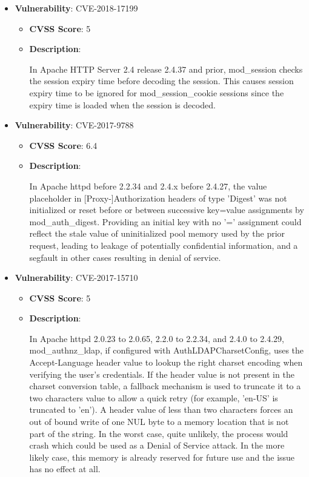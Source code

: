 \documentclass{article}
\begin{document}
\begin{itemize}
        \item \textbf{Vulnerability}: CVE-2018-17199
        \begin{itemize}
            \item \textbf{CVSS Score}:  5 
            \item \textbf{Description}:
            \parbox[t]{0.9\linewidth}{
                \ttfamily In Apache HTTP Server 2.4 release 2.4.37 and prior, mod\_session checks the session expiry time before decoding the session. This causes session expiry time to be ignored for mod\_session\_cookie sessions since the expiry time is loaded when the session is decoded.
            }
        \end{itemize}
    
        \item \textbf{Vulnerability}: CVE-2017-9788
        \begin{itemize}
            \item \textbf{CVSS Score}:  6.4 
            \item \textbf{Description}:
            \parbox[t]{0.9\linewidth}{
                \ttfamily In Apache httpd before 2.2.34 and 2.4.x before 2.4.27, the value placeholder in [Proxy-]Authorization headers of type 'Digest' was not initialized or reset before or between successive key=value assignments by mod\_auth\_digest. Providing an initial key with no '=' assignment could reflect the stale value of uninitialized pool memory used by the prior request, leading to leakage of potentially confidential information, and a segfault in other cases resulting in denial of service.
            }
        \end{itemize}
    
        \item \textbf{Vulnerability}: CVE-2017-15710
        \begin{itemize}
            \item \textbf{CVSS Score}:  5 
            \item \textbf{Description}:
            \parbox[t]{0.9\linewidth}{
                \ttfamily In Apache httpd 2.0.23 to 2.0.65, 2.2.0 to 2.2.34, and 2.4.0 to 2.4.29, mod\_authnz\_ldap, if configured with AuthLDAPCharsetConfig, uses the Accept-Language header value to lookup the right charset encoding when verifying the user's credentials. If the header value is not present in the charset conversion table, a fallback mechanism is used to truncate it to a two characters value to allow a quick retry (for example, 'en-US' is truncated to 'en'). A header value of less than two characters forces an out of bound write of one NUL byte to a memory location that is not part of the string. In the worst case, quite unlikely, the process would crash which could be used as a Denial of Service attack. In the more likely case, this memory is already reserved for future use and the issue has no effect at all.
            }
        \end{itemize}
    

\end{itemize}
\end{document}
